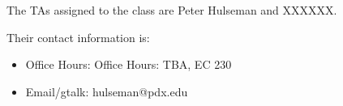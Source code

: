 The TAs assigned to the class are Peter Hulseman and XXXXXX. 

Their contact information is:
\begin{itemize}
 \item Office Hours: Office Hours: TBA, EC 230
 \item Email/gtalk: hulseman@pdx.edu
\end{itemize}
